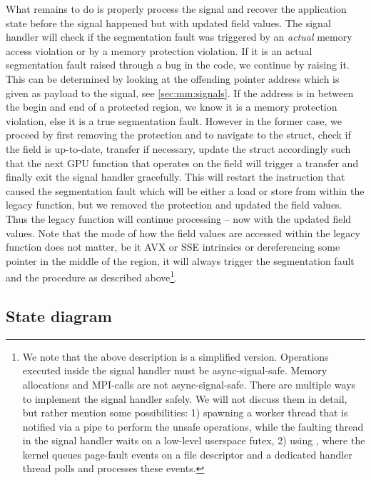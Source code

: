 What remains to do is properly process the signal and recover the application state before the signal happened but with updated field values.
The signal handler will check if the segmentation fault was triggered by an \emph{actual} memory access violation or by a memory protection violation.
If it is an actual segmentation fault raised through a bug in the code, we continue by raising it.
This can be determined by looking at the offending pointer address which is given as payload to the signal, see \cref{sec:mm:signals}.
If the address is in between the begin and end of a protected region, we know it is a memory protection violation, else it is a true segmentation fault.
However in the former case, we proceed by first removing the protection and to navigate to the  struct, check if the field is up-to-date, transfer if necessary, update the  struct accordingly such that the next GPU function that operates on the field will trigger a transfer and finally exit the signal handler gracefully.
This will restart the instruction that caused the segmentation fault which will be either a load or store from within the legacy \openqxd function, but we removed the protection and updated the field values.
Thus the legacy function will continue processing -- now with the updated field values.
Note that the mode of how the field values are accessed within the legacy function does not matter, be it AVX or SSE intrinsics or dereferencing some pointer in the middle of the region, it will always trigger the segmentation fault and the procedure as described above\footnote{We note that the above description is a simplified version. Operations executed inside the signal handler must be async-signal-safe. Memory allocations and MPI-calls are not async-signal-safe. There are multiple ways to implement the signal handler safely. We will not discuss them in detail, but rather mention some possibilities: 1) spawning a worker thread that is notified via a pipe to perform the unsafe operations, while the faulting thread in the signal handler waits on a low-level userspace futex, 2) using , where the kernel queues page-fault events on a file descriptor and a dedicated handler thread polls and processes these events.}.

\subsection{State diagram}

